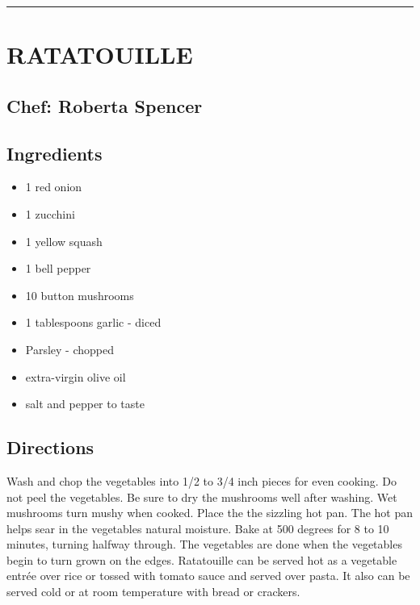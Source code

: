\documentclass[
]{book}
\providecommand{\tightlist}{%
  \setlength{\itemsep}{0pt}\setlength{\parskip}{0pt}}
\begin{document}
\begin{center}\rule{0.5\linewidth}{0.5pt}\end{center}

\hypertarget{ratatouille}{%
\section*{RATATOUILLE}\label{ratatouille}}


\hypertarget{chef-roberta-spencer-10}{%
\subsection*{Chef: Roberta Spencer}\label{chef-roberta-spencer-10}}


\hypertarget{ingredients-36}{%
\subsection*{Ingredients}\label{ingredients-36}}


\begin{itemize}
\tightlist
\item
  1 red onion
\item
  1 zucchini
\item
  1 yellow squash
\item
  1 bell pepper
\item
  10 button mushrooms
\item
  1 tablespoons garlic - diced
\item
  Parsley - chopped
\item
  extra-virgin olive oil
\item
  salt and pepper to taste
\end{itemize}

\hypertarget{directions-36}{%
\subsection*{Directions}\label{directions-36}}


Wash and chop the vegetables into 1/2 to 3/4 inch pieces for even cooking. Do not peel the vegetables. Be sure to dry the mushrooms well after washing. Wet mushrooms turn mushy when cooked. Place the the sizzling hot pan. The hot pan helps sear in the vegetables natural moisture. Bake at 500 degrees for 8 to 10 minutes, turning halfway through. The vegetables are done when the vegetables begin to turn grown on the edges. Ratatouille can be served hot as a vegetable entrée over rice or tossed with tomato sauce and served over pasta. It also can be served cold or at room temperature with bread or crackers.
\end{document}
